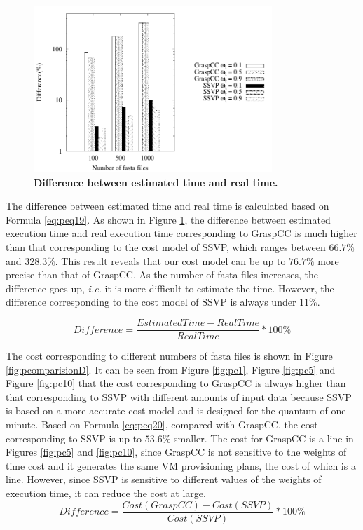 \begin{figure}[htbp]
\begin{centering}
\captionsetup{justification=centering}
\includegraphics[width=90mm]{figures/FIG7}
\par\end{centering}
\caption{\textbf{Difference between estimated time and real time. }}
\label{fig:pDIFF}
\end{figure}

The difference between estimated time and real time is calculated based on Formula \ref{eq:peq19}. As shown in Figure \ref{fig:pDIFF}, the difference between estimated execution time and real execution time corresponding to GraspCC is much higher than that corresponding to the cost model of SSVP, which ranges between $66.7\%$ and $328.3\%$. This result reveals that our cost model can be up to $76.7\%$ more precise than that of GraspCC. As the number of fasta files increases, the difference goes up, \textit{i.e.} it is more difficult to estimate the time. However, the difference corresponding to the cost model of SSVP is always under $11\%$. 

\begin{equation}\label{eq:peq19}
Difference = \frac{EstimatedTime - RealTime}{RealTime} * 100 \%
\end{equation}

The cost corresponding to different numbers of fasta files is shown in Figure \ref{fig:pcomparisionD}. It can be seen from Figure \ref{fig:pc1}, Figure \ref{fig:pc5} and Figure \ref{fig:pc10} that the cost corresponding to GraspCC is always higher than that corresponding to SSVP with different amounts of input data because SSVP is based on a more accurate cost model and is designed for the quantum of one minute. Based on Formula \ref{eq:peq20}, compared with GraspCC, the cost corresponding to SSVP is up to $53.6\%$ smaller. The cost for GraspCC is a line in Figures \ref{fig:pc5} and \ref{fig:pc10}, since GraspCC is not sensitive to the weights of time cost and it generates the same VM provisioning plans, the cost of which is a line. However, since SSVP is sensitive to different values of the weights of execution time, it can reduce the cost at large.
\begin{equation}\label{eq:peq20}
Difference = \frac{Cost(GraspCC) - Cost(SSVP)}{Cost(SSVP)} * 100 \%
\end{equation}


